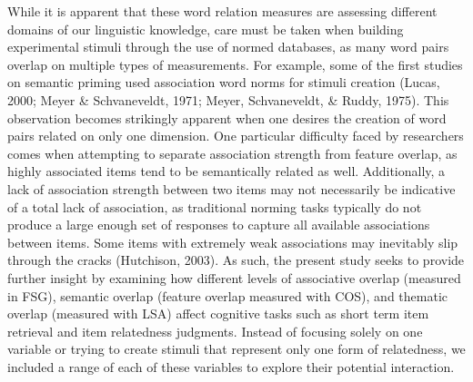 \documentclass[english,,man]{apa6}
\begin{document}
While it is apparent that these word relation measures are assessing
different domains of our linguistic knowledge, care must be taken when
building experimental stimuli through the use of normed databases, as
many word pairs overlap on multiple types of measurements. For example,
some of the first studies on semantic priming used association word
norms for stimuli creation (Lucas, 2000; Meyer \& Schvaneveldt, 1971;
Meyer, Schvaneveldt, \& Ruddy, 1975). This observation becomes
strikingly apparent when one desires the creation of word pairs related
on only one dimension. One particular difficulty faced by researchers
comes when attempting to separate association strength from feature
overlap, as highly associated items tend to be semantically related as
well. Additionally, a lack of association strength between two items may
not necessarily be indicative of a total lack of association, as
traditional norming tasks typically do not produce a large enough set of
responses to capture all available associations between items. Some
items with extremely weak associations may inevitably slip through the
cracks (Hutchison, 2003). As such, the present study seeks to provide
further insight by examining how different levels of associative overlap
(measured in FSG), semantic overlap (feature overlap measured with COS),
and thematic overlap (measured with LSA) affect cognitive tasks such as
short term item retrieval and item relatedness judgments. Instead of
focusing solely on one variable or trying to create stimuli that
represent only one form of relatedness, we included a range of each of
these variables to explore their potential interaction.
\end{document}

